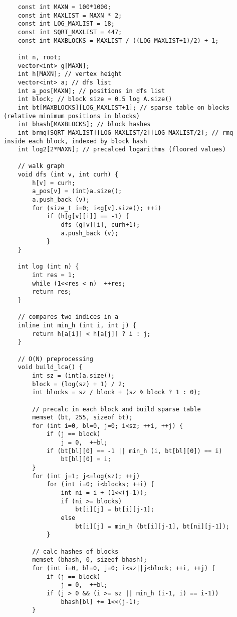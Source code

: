 \documentclass{article}
\begin{document}
\begin{verbatim}
    const int MAXN = 100*1000;
    const int MAXLIST = MAXN * 2;
    const int LOG_MAXLIST = 18;
    const int SQRT_MAXLIST = 447;
    const int MAXBLOCKS = MAXLIST / ((LOG_MAXLIST+1)/2) + 1;

    int n, root;
    vector<int> g[MAXN];
    int h[MAXN]; // vertex height
    vector<int> a; // dfs list
    int a_pos[MAXN]; // positions in dfs list
    int block; // block size = 0.5 log A.size()
    int bt[MAXBLOCKS][LOG_MAXLIST+1]; // sparse table on blocks (relative minimum positions in blocks)
    int bhash[MAXBLOCKS]; // block hashes
    int brmq[SQRT_MAXLIST][LOG_MAXLIST/2][LOG_MAXLIST/2]; // rmq inside each block, indexed by block hash
    int log2[2*MAXN]; // precalced logarithms (floored values)

    // walk graph
    void dfs (int v, int curh) {
        h[v] = curh;
        a_pos[v] = (int)a.size();
        a.push_back (v);
        for (size_t i=0; i<g[v].size(); ++i)
            if (h[g[v][i]] == -1) {
                dfs (g[v][i], curh+1);
                a.push_back (v);
            }
    }

    int log (int n) {
        int res = 1;
        while (1<<res < n)  ++res;
        return res;
    }

    // compares two indices in a
    inline int min_h (int i, int j) {
        return h[a[i]] < h[a[j]] ? i : j;
    }

    // O(N) preprocessing
    void build_lca() {
        int sz = (int)a.size();
        block = (log(sz) + 1) / 2;
        int blocks = sz / block + (sz % block ? 1 : 0);

        // precalc in each block and build sparse table
        memset (bt, 255, sizeof bt);
        for (int i=0, bl=0, j=0; i<sz; ++i, ++j) {
            if (j == block)
                j = 0,  ++bl;
            if (bt[bl][0] == -1 || min_h (i, bt[bl][0]) == i)
                bt[bl][0] = i;
        }
        for (int j=1; j<=log(sz); ++j)
            for (int i=0; i<blocks; ++i) {
                int ni = i + (1<<(j-1));
                if (ni >= blocks)
                    bt[i][j] = bt[i][j-1];
                else
                    bt[i][j] = min_h (bt[i][j-1], bt[ni][j-1]);
            }

        // calc hashes of blocks
        memset (bhash, 0, sizeof bhash);
        for (int i=0, bl=0, j=0; i<sz||j<block; ++i, ++j) {
            if (j == block)
                j = 0,  ++bl;
            if (j > 0 && (i >= sz || min_h (i-1, i) == i-1))
                bhash[bl] += 1<<(j-1);
        }


\end{verbatim}
\end{document}

